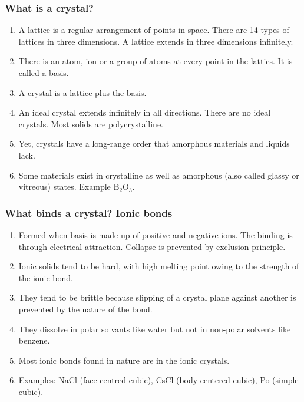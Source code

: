 \documentclass{beamer}
\begin{document}
\begin{frame}
\frametitle{What is a crystal?}
\begin{enumerate}
\item A lattice is a regular arrangement of points in space. There are 
\href{https://en.wikipedia.org/wiki/Bravais_lattice}{14 types} of lattices in
three dimensions. A lattice extends in three dimensions infinitely.
\item There is an atom, ion or a group of atoms at every point in the lattics. 
It is called a basis.
\item A crystal is a lattice plus the basis.
\item An ideal crystal extends infinitely in all directions. There are no ideal
crystals. Most solids are polycrystalline.
\item Yet, crystals have a long-range order that amorphous materials and liquids
lack.
\item Some materials exist in crystalline as well as amorphous (also called 
glassy or vitreous) states. Example B$_{2}$O$_{3}$.
\end{enumerate}
\end{frame}

\begin{frame}
\frametitle{What binds a crystal? Ionic bonds}
\begin{enumerate}
\item Formed when basis is made up of positive and negative ions. The binding is
through electrical attraction. Collapse is prevented by exclusion principle.
\item Ionic solids tend to be hard, with high melting point owing to the 
strength of the ionic bond.
\item They tend to be brittle because slipping of a crystal plane against 
another is prevented by the nature of the bond.
\item They dissolve in polar solvants like water but not in non-polar solvents
like benzene.
\item Most ionic bonds found in nature are in the ionic crystals. 
\item Examples: NaCl (face centred cubic), CsCl (body centered cubic), Po (simple
cubic).
\end{enumerate}
\end{frame}
\end{document}
